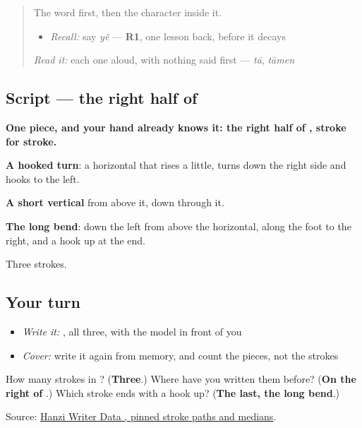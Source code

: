 \begin{quote}
The word first, then the character inside it.

\begin{itemize}
\raggedright
  \item \emph{Recall:} say \emph{yě} — \textbf{R1}, one lesson back, before it decays
\end{itemize}

\begin{quote}
 
\end{quote}

\emph{Read it:} each one aloud, with nothing said first — \emph{tā}, \emph{tāmen}
\end{quote}

\subsection*{Script — the right half of }

\begin{quote}
\end{quote}

\textbf{One piece, and your hand already knows it: the right half of , stroke for stroke.}

\textbf{A hooked turn}: a horizontal that rises a little, turns down the right side and hooks to the left.

\textbf{A short vertical} from above it, down through it.

\textbf{The long bend}: down the left from above the horizontal, along the foot to the right, and a hook up at the end.

Three strokes.

\subsection*{Your turn}
\begin{itemize}
\raggedright
  \item \emph{Write it:} , all three, with the model in front of you
  \item \emph{Cover:} write it again from memory, and count the pieces, not the strokes
\end{itemize}

\begin{tcolorbox}[breakable,colback=teal!4,colframe=teal!35!black,title={Before you move on}]
How many strokes in ? (\textbf{Three}.) Where have you written them before? (\textbf{On the right of }.) Which stroke ends with a hook up? (\textbf{The last, the long bend}.)

Source: \href{https://raw.githubusercontent.com/chanind/hanzi-writer-data/68d10a4b21150cae5e1ebbd223eed289cf32d90c/data/\%E4\%B9\%9F.json}{Hanzi Writer Data , pinned stroke paths and medians}.
\end{tcolorbox}
